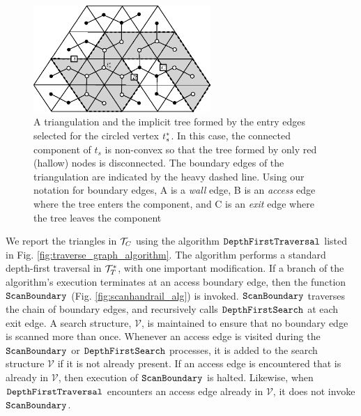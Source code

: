   \begin{figure}[th]
	  \centering
		  \includegraphics[width=0.6\textwidth]{Fig9}
	  \caption[Boundary edge definitions]{A triangulation and the implicit tree 
	  formed by the entry edges selected for the circled vertex $t^*_s$. 
	  In this case, the connected component of $t_s$ is non-convex so that the tree 
	  formed by only red (hallow) nodes is disconnected. 
	  The boundary edges of the triangulation are indicated by the heavy dashed 
	  line. 
	  Using our notation for boundary edges, A is a \emph{wall} edge, B is an 
	  \emph{access} edge where the tree enters the component, and C is an 
	  \emph{exit} edge where the tree leaves the component}
	  \label{fig:imp_tree_non-convex}
  \end{figure}

  We report the triangles in ${\mathcal{T}}_C$ using the algorithm 
  $\texttt{DepthFirstTraversal}$ listed in Fig. \ref{fig:traverse_graph_algorithm}.
  The algorithm performs a standard depth-first traversal in 
  $\mathcal{T}^*_T$, with one important modification. 
  If a branch of the algorithm's execution terminates at an access boundary 
  edge, then the function $\texttt{ScanBoundary}$ (Fig. \ref{fig:scanhandrail_alg}) 
  is invoked. 
  $\texttt{ScanBoundary}$ traverses the chain of boundary edges, and recursively calls 
  $\texttt{DepthFirstSearch}$ at each exit edge. 
  A search structure, $\mathcal{V}$, is maintained to ensure that no boundary edge is 
  scanned more than once.  
  Whenever an access edge is visited during the $\texttt{ScanBoundary}$ 
  or $\texttt{DepthFirstSearch}$ 
  processes, it is added to the search structure $\mathcal{V}$ if it is not already 
  present. 
  If an access edge is encountered that is already in $\mathcal{V}$, then execution 
  of $\texttt{ScanBoundary}$ is halted. 
  Likewise, when $\texttt{DepthFirstTraversal}$ encounters an access edge already in 
  $\mathcal{V}$, it does not invoke $\texttt{ScanBoundary}$. 

